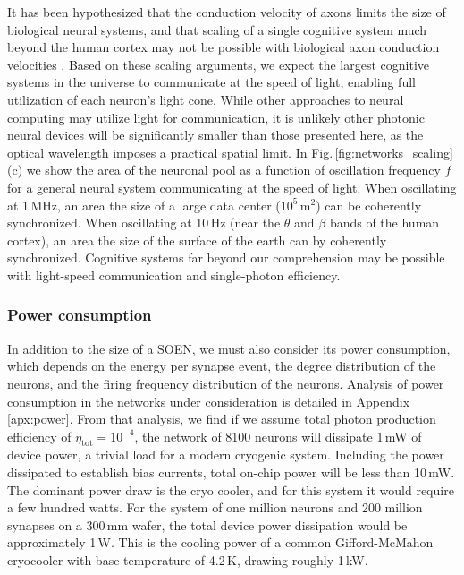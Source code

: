 \documentclass[aip,amsmath,amssymb,reprint,nofootinbib]{revtex4-1}
\begin{document}
It has been hypothesized that the conduction velocity of axons limits the size of biological neural systems, and that scaling of a single cognitive system much beyond the human cortex may not be possible with biological axon conduction velocities \cite{rido1994,bu2006}. Based on these scaling arguments, we expect the largest cognitive systems in the universe to communicate at the speed of light, enabling full utilization of each neuron's light cone. While other approaches to neural computing may utilize light for communication, it is unlikely other photonic neural devices will be significantly smaller than those presented here, as the optical wavelength imposes a practical spatial limit. In Fig.\,\ref{fig:networks_scaling}(c) we show the area of the neuronal pool as a function of oscillation frequency $f$ for a general neural system communicating at the speed of light. When oscillating at 1\,MHz, an area the size of a large data center ($10^5$\,m$^2$) can be coherently synchronized. When oscillating at 10\,Hz (near the $\theta$ and $\beta$ bands of the human cortex), an area the size of the surface of the earth can by coherently synchronized. Cognitive systems far beyond our comprehension may be possible with light-speed communication and single-photon efficiency.

\subsubsection{Power consumption}
In addition to the size of a SOEN, we must also consider its power consumption, which depends on the energy per synapse event, the degree distribution of the neurons, and the firing frequency distribution of the neurons. Analysis of power consumption in the networks under consideration is detailed in Appendix \ref{apx:power}. From that analysis, we find if we assume total photon production efficiency of $\eta_{\mathrm{tot}} = 10^{-4}$, the network of 8100 neurons will dissipate 1\,mW of device power, a trivial load for a modern cryogenic system. Including the power dissipated to establish bias currents, total on-chip power will be less than 10\,mW. The dominant power draw is the cryo cooler, and for this system it would require a few hundred watts. For the system of one million neurons and 200 million synapses on a 300\,mm wafer, the total device power dissipation would be approximately 1\,W. This is the cooling power of a common Gifford-McMahon cryocooler with base temperature of 4.2\,K, drawing roughly 1\,kW. 
\end{document}
